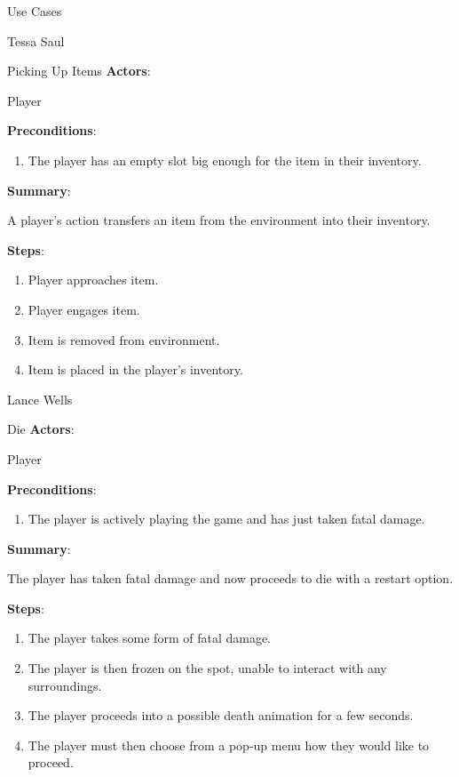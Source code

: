\documentclass[12pt]{report}
\begin{document}
\begin{section}{Use Cases}
\begin{subsection}{Tessa Saul}
\begin{subsubsection}{Picking Up Items}
\textbf{Actors}:

Player

\textbf{Preconditions}:

\begin{enumerate}
\item The player has an empty slot big enough for the item in their
inventory.
\end{enumerate}

\textbf{Summary}:

A player's action transfers an item from the environment into their
inventory.

\textbf{Steps}:

\begin{enumerate}
\item Player approaches item.
\item Player engages item.
\item Item is removed from environment.
\item Item is placed in the player's  inventory.
\end{enumerate}
\end{subsubsection}
\end{subsection}

\begin{subsection}{Lance Wells}
\begin{subsubsection}{Die}
\textbf{Actors}:

Player

\textbf{Preconditions}:

\begin{enumerate}
\item The player is actively playing the game and has just taken
fatal damage.
\end{enumerate}

\textbf{Summary}:

The player has taken fatal damage and now proceeds to die with a
restart option.

\textbf{Steps}:

\begin{enumerate}
\item The player takes some form of fatal damage.
\item The player is then frozen on the spot, unable to interact with any
surroundings.
\item The player proceeds into a possible death animation for a few seconds.
\item The player must then choose from a pop-up menu how they would like to
proceed.
\end{enumerate}
\end{subsubsection}


\end{subsection}
\end{section}
\end{document}
